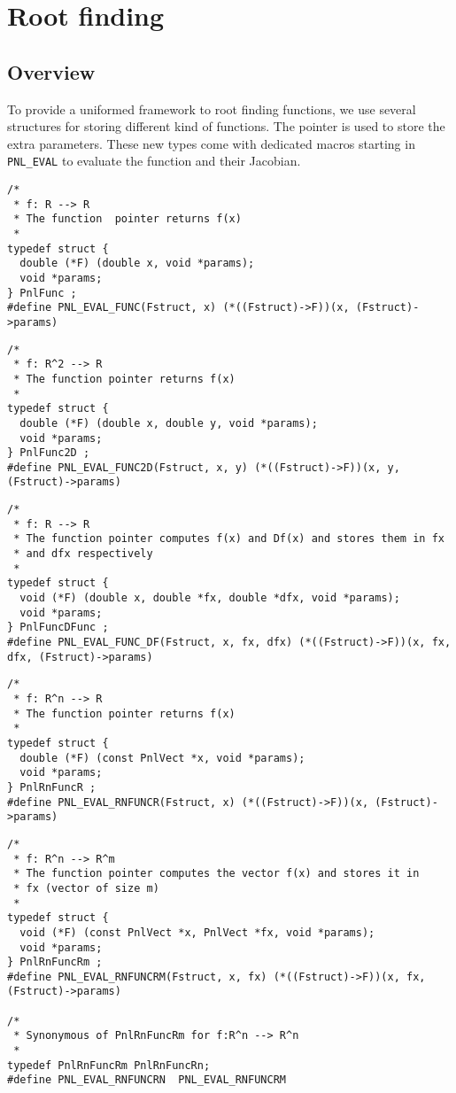 \section{Root finding}
\subsection{Overview}
\label{sec:PnlFunc}

To provide a uniformed framework to root finding functions, we use several
structures for storing different kind of functions. The pointer
 is used to store the extra parameters. These new types come
with dedicated macros starting in \verb!PNL_EVAL!  to evaluate the function
and their Jacobian.
\begin{verbatim}
/*
 * f: R --> R
 * The function  pointer returns f(x)
 *
typedef struct {
  double (*F) (double x, void *params);
  void *params;
} PnlFunc ;
#define PNL_EVAL_FUNC(Fstruct, x) (*((Fstruct)->F))(x, (Fstruct)->params)
\end{verbatim}

\begin{verbatim}
/*
 * f: R^2 --> R
 * The function pointer returns f(x)
 *
typedef struct {
  double (*F) (double x, double y, void *params);
  void *params;
} PnlFunc2D ;
#define PNL_EVAL_FUNC2D(Fstruct, x, y) (*((Fstruct)->F))(x, y, (Fstruct)->params)
\end{verbatim}

\begin{verbatim}
/*
 * f: R --> R
 * The function pointer computes f(x) and Df(x) and stores them in fx
 * and dfx respectively
 *
typedef struct {
  void (*F) (double x, double *fx, double *dfx, void *params);
  void *params;
} PnlFuncDFunc ;
#define PNL_EVAL_FUNC_DF(Fstruct, x, fx, dfx) (*((Fstruct)->F))(x, fx, dfx, (Fstruct)->params)
\end{verbatim}

\begin{verbatim}
/*
 * f: R^n --> R
 * The function pointer returns f(x)
 *
typedef struct {
  double (*F) (const PnlVect *x, void *params);
  void *params;
} PnlRnFuncR ;
#define PNL_EVAL_RNFUNCR(Fstruct, x) (*((Fstruct)->F))(x, (Fstruct)->params)
\end{verbatim}

\begin{verbatim}
/*
 * f: R^n --> R^m
 * The function pointer computes the vector f(x) and stores it in
 * fx (vector of size m)
 *
typedef struct {
  void (*F) (const PnlVect *x, PnlVect *fx, void *params);
  void *params;
} PnlRnFuncRm ;
#define PNL_EVAL_RNFUNCRM(Fstruct, x, fx) (*((Fstruct)->F))(x, fx, (Fstruct)->params)

/*
 * Synonymous of PnlRnFuncRm for f:R^n --> R^n
 *
typedef PnlRnFuncRm PnlRnFuncRn;
#define PNL_EVAL_RNFUNCRN  PNL_EVAL_RNFUNCRM
\end{verbatim}

